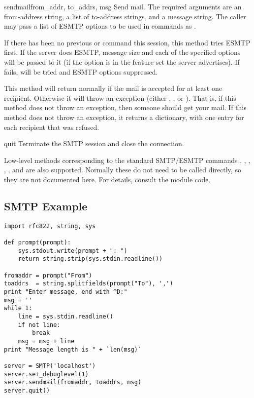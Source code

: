 \begin{methoddesc}{sendmail}{from_addr, to_addrs, msg}
Send mail.  The required arguments are an  from-address
string, a list of  to-address strings, and a message string.
The caller may pass a list of ESMTP options to be used in  commands as .

If there has been no previous  or  command this
session, this method tries ESMTP  first. If the server does
ESMTP, message size and each of the specified options will be passed
to it (if the option is in the feature set the server advertises).  If
 fails,  will be tried and ESMTP options
suppressed.

This method will return normally if the mail is accepted for at least 
one recipient. Otherwise it will throw an exception (either
, , or
).  That is, if this method does not throw an
exception, then someone should get your mail.  If this method does not
throw an exception, it returns a dictionary, with one entry for each
recipient that was refused.
\end{methoddesc}

\begin{methoddesc}{quit}{}
Terminate the SMTP session and close the connection.
\end{methoddesc}

Low-level methods corresponding to the standard SMTP/ESMTP commands
, , , , , and
 are also supported.  Normally these do not need to be
called directly, so they are not documented here.  For details,
consult the module code.


\subsection{SMTP Example \label{SMTP-example}}


\begin{verbatim}
import rfc822, string, sys

def prompt(prompt):
    sys.stdout.write(prompt + ": ")
    return string.strip(sys.stdin.readline())

fromaddr = prompt("From")
toaddrs  = string.splitfields(prompt("To"), ',')
print "Enter message, end with ^D:"
msg = ''
while 1:
    line = sys.stdin.readline()
    if not line:
        break
    msg = msg + line
print "Message length is " + `len(msg)`

server = SMTP('localhost')
server.set_debuglevel(1)
server.sendmail(fromaddr, toaddrs, msg)
server.quit()
\end{verbatim}


